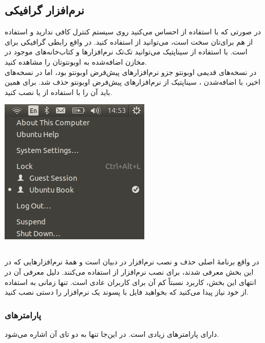 \subsection[نرم‌افزار گرافیکی Synaptic]{نرم‌افزار گرافیکی }
در صورتی که با استفاده از  احساس می‌کنید روی سیستم کنترل کافی ندارید و استفاده از  هم برای‌تان سخت است، می‌توانید از  استفاده کنید.  در واقع رابطی گرافیکی برای  است. با استفاده از سیناپتیک می‌توانید تک‌تک نرم‌افزارها و کتاب‌خانه‌های موجود در مخازن اضافه‌شده به اوبونتوتان را مشاهده کنید.\\
 در نسخه‌های قدیمی اوبونتو جزو نرم‌افزارهای پیش‌فرض اوبونتو بود، اما در نسخه‌های اخیر، با اضافه‌شدن ، سیناپتیک از نرم‌افزارهای پیش‌فرض اوبونتو حذف شد. برای همین باید آن را با استفاده از  یا  نصب کنید.

\begin{center}
\includegraphics[scale=0.37]{pics/22.png}
\end{center}


\subsection[dpkg]{}
 در واقع برنامهٔ اصلی حذف و نصب نرم‌افزار در دبیان است و همهٔ نرم‌افزارهایی که در این بخش معرفی شدند، برای نصب نرم‌افزار از  استفاده می‌کنند. دلیل معرفی آن در انتهای این بخش، کاربرد نسبتاً کم آن برای کاربران عادی است. تنها زمانی به استفاده از خود  نیاز پیدا می‌کنید که بخواهید فایل با پسوند  یک نرم‌افزار را دستی نصب کنید.\\

\subsubsection[پارامترهای dpkg]{پارامترهای }
 دارای پارامترهای زیادی است. در این‌جا تنها به دو تای آن اشاره می‌شود.

